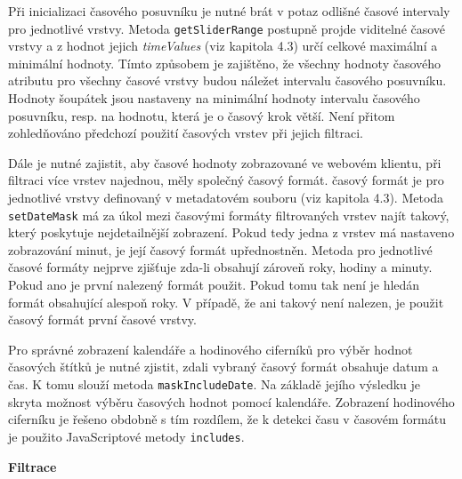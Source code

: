 Při inicializaci časového posuvníku je nutné brát v potaz odlišné časové intervaly pro jednotlivé vrstvy. Metoda \verb|getSliderRange| postupně projde viditelné časové vrstvy a z hodnot jejich \textit{timeValues} (viz kapitola 4.3) určí celkové maximální a minimální hodnoty. Tímto způsobem je zajištěno, že všechny hodnoty časového atributu pro všechny časové vrstvy budou náležet intervalu časového posuvníku. Hodnoty šoupátek jsou nastaveny na minimální hodnoty intervalu časového posuvníku, resp. na hodnotu, která je o časový krok větší. Není přitom zohledňováno předchozí použití časových vrstev při jejich filtraci.

Dále je nutné zajistit, aby časové hodnoty zobrazované ve webovém klientu, při filtraci více vrstev najednou, měly společný časový formát. časový formát je pro jednotlivé vrstvy definovaný v metadatovém souboru (viz kapitola 4.3). Metoda \verb|setDateMask| má za úkol mezi časovými formáty filtrovaných vrstev najít takový, který poskytuje nejdetailnější zobrazení. Pokud tedy jedna z vrstev má nastaveno zobrazování minut, je její časový formát upřednostněn. Metoda pro jednotlivé časové formáty nejprve zjišťuje zda-li obsahují zároveň roky, hodiny a minuty. Pokud ano je první nalezený formát použit. Pokud tomu tak není je hledán formát obsahující alespoň roky. V případě, že ani takový není nalezen, je použit časový formát první časové vrstvy.

Pro správné zobrazení kalendáře a hodinového ciferníků pro výběr hodnot časových štítků je nutné zjistit, zdali vybraný časový formát obsahuje datum a čas. K tomu slouží metoda \verb|maskIncludeDate|. Na základě jejího výsledku je skryta možnost výběru časových hodnot pomocí kalendáře. Zobrazení hodinového ciferníku je řešeno obdobně s tím rozdílem, že k detekci času v časovém formátu je použito JavaScriptové metody \verb|includes|.

\bigskip
\noindent \textbf{Filtrace}

